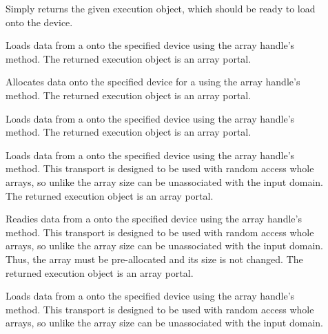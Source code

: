 \begin{description}
\item[]
   Simply returns the given execution
  object, which should be ready to load onto the device.
\item[] 
  Loads data from a  onto the specified device using
  the array handle's  method. The returned
  execution object is an array portal.
\item[] 
  Allocates data onto the specified device for a 
  using the array handle's  method. The returned
  execution object is an array portal.
\item[] 
  Loads data from a  onto the specified device using the array handle's  method.
  The returned execution object is an array portal.
\item[] 
  Loads data from a  onto the specified device using the array handle's  method.
  This transport is designed to be used with random access whole arrays, so unlike  the array size can be unassociated with the input domain.
  The returned execution object is an array portal.
\item[] 
  Readies data from a  onto the specified device using the array handle's  method.
  This transport is designed to be used with random access whole arrays, so unlike  the array size can be unassociated with the input domain.
  Thus, the array must be pre-allocated and its size is not changed.
  The returned execution object is an array portal.
\item[] 
  Loads data from a  onto the specified device using the array handle's  method.
  This transport is designed to be used with random access whole arrays, so unlike  the array size can be unassociated with the input domain.

\end{description}
